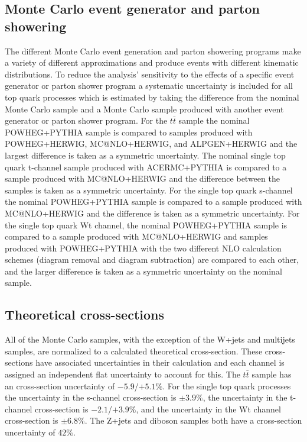 \subsection{Monte Carlo event generator and parton showering}
\label{SECTION-RESULTS-SYSTEMATICS-GENERATOR}
The different Monte Carlo event generation and parton showering programs make a variety of different approximations and produce events with different kinematic distributions. To reduce the analysis' sensitivity to the effects of a specific event generator or parton shower program a systematic uncertainty is included for all top quark processes which is estimated by taking the difference from the nominal Monte Carlo sample and a Monte Carlo sample produced with another event generator or parton shower program. For the $t\bar{t}$ sample the nominal POWHEG+PYTHIA sample is compared to samples produced with POWHEG+HERWIG, MC@NLO+HERWIG, and ALPGEN+HERWIG and the largest difference is taken as a symmetric uncertainty. The nominal single top quark t-channel sample produced with ACERMC+PYTHIA is compared to a sample produced with MC@NLO+HERWIG and the difference between the samples is taken as a symmetric uncertainty. For the single top quark s-channel the nominal POWHEG+PYTHIA sample is compared to a sample produced with MC@NLO+HERWIG and the difference is taken as a symmetric uncertainty. For the single top quark Wt channel, the nominal POWHEG+PYTHIA sample is compared to a sample produced with MC@NLO+HERWIG and samples produced with POWHEG+PYTHIA with the two different NLO calculation schemes (diagram removal and diagram subtraction) are compared to each other, and the larger difference is taken as a symmetric uncertainty on the nominal sample. 

\subsection{Theoretical cross-sections}
\label{SECTION-RESULTS-SYSTEMATICS-XS}
All of the Monte Carlo samples, with the exception of the W+jets and multijets samples, are normalized to a calculated theoretical cross-section. These cross-sections have associated uncertainties in their calculation and each channel is assigned an independent flat uncertainty to account for this. The $t\bar{t}$ sample has an cross-section uncertainty of $-5.9$/$+5.1\%$. For the single top quark processes the uncertainty in the s-channel cross-section is $\pm 3.9\%$, the uncertainty in the t-channel cross-section is  $-2.1$/$+3.9\%$, and the uncertainty in the Wt channel cross-section is $\pm 6.8\%$. The Z+jets and diboson samples both have a cross-section uncertainty of $42\%$.

